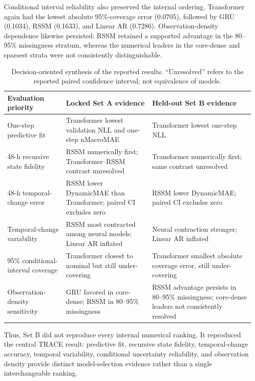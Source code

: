 \documentclass[preprint,12pt]{elsarticle}
\begin{document}
Conditional interval reliability also preserved the internal ordering.
Transformer again had the lowest absolute 95\%-coverage error (0.0705),
followed by GRU (0.1034), RSSM (0.1633), and Linear AR (0.7286).
Observation-density dependence likewise persisted: RSSM retained a
supported advantage in the 80--95\% missingness stratum, whereas the
numerical leaders in the core-dense and sparsest strata were not
consistently distinguishable.

\begin{table}[ht]
\centering
\caption{Decision-oriented synthesis of the reported results. ``Unresolved'' refers to the reported paired confidence interval, not equivalence of models.}
\label{tab:decision_summary}
\small
\begin{tabularx}{\textwidth}{p{3.0cm}p{3.5cm}X}
\toprule
Evaluation priority & Locked Set A evidence & Held-out Set B evidence \\
\midrule
One-step predictive fit & Transformer lowest validation NLL and one-step nMacroMAE & Transformer lowest one-step NLL \\
48-h recursive state fidelity & RSSM numerically first; Transformer--RSSM contrast unresolved & Transformer numerically first; same contrast unresolved \\
48-h temporal-change error & RSSM lower DynamicMAE than Transformer; paired CI excludes zero & RSSM lower DynamicMAE; paired CI excludes zero \\
Temporal-change variability & RSSM most contracted among neural models; Linear AR inflated & Neural contraction stronger; Linear AR inflated \\
95\% conditional-interval coverage & Transformer closest to nominal but still under-covering & Transformer smallest absolute coverage error, still under-covering \\
Observation-density sensitivity & GRU favored in core-dense; RSSM in 80--95\% missingness & RSSM advantage persists in 80--95\% missingness; core-dense leaders not consistently resolved \\
\bottomrule
\end{tabularx}
\end{table}

Thus, Set B did not reproduce every internal numerical ranking. It
reproduced the central TRACE result: predictive fit, recursive state
fidelity, temporal-change accuracy, temporal variability, conditional
uncertainty reliability, and observation density provide distinct
model-selection evidence rather than a single interchangeable ranking.
\end{document}
